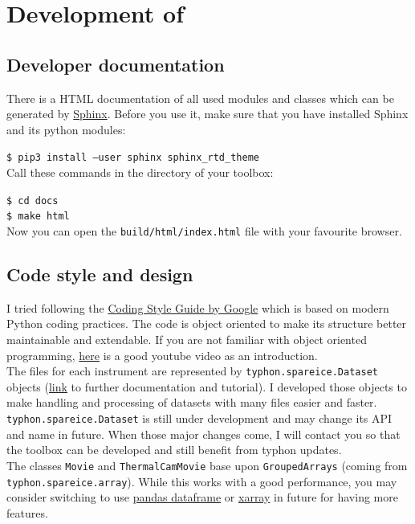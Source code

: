 \documentclass[11pt,a4paper]{article}
\begin{document}
\section{Development of \cloud}
\label{sec:development}

\subsection{Developer documentation}
There is a HTML documentation of all used modules and classes which can be generated by \href{http://www.sphinx-doc.org/en/stable/install.html}{Sphinx}. Before you use it, make sure that you have installed Sphinx and its python modules:

\texttt{\$ pip3 install --user sphinx sphinx\_rtd\_theme}\\

Call these commands in the directory of your \cloud toolbox:

\texttt{\$ cd docs}\\
\texttt{\$ make html}\\

Now you can open the \texttt{build/html/index.html} file with your favourite browser.

\subsection{Code style and design}
I tried following the \href{https://google.github.io/styleguide/pyguide.html}{Coding Style Guide by Google}  which is based on modern Python coding practices. The code is object oriented to make its structure better maintainable and extendable. If you are not familiar with object oriented programming, \href{https://www.youtube.com/watch?v=ZDa-Z5JzLYM}{here} is a good youtube video as an introduction.\\

The files for each instrument are represented by \texttt{typhon.spareice.Dataset} objects (\href{http://radiativetransfer.org/misc/typhon/doc-trunk/tutorials/dataset.html}{link} to further documentation and tutorial). I developed those objects to make handling and processing of datasets with many files easier and faster. \texttt{typhon.spareice.Dataset} is still under development and may change its API and name in future. When those major changes come, I will contact you so that the \cloud toolbox can be developed and still benefit from typhon updates.\\

The classes \texttt{Movie} and \texttt{ThermalCamMovie} base upon \texttt{GroupedArrays} (coming from \texttt{typhon.spareice.array}). While this works with a good performance, you may consider switching to use \href{https://pandas.pydata.org/pandas-docs/stable/generated/pandas.DataFrame.html#pandas-dataframe}{pandas dataframe} or \href{http://xarray.pydata.org/en/stable/}{xarray} in future for having more features.
\end{document}

